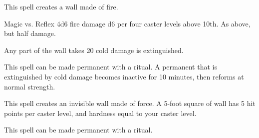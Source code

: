 \begin{spellheader}
\end{spellheader}
\begin{spellcontent}
    \begin{spelltargetinginfo}
    \end{spelltargetinginfo}
    \begin{spelleffects}
        \spelleffect This spell creates a wall made of fire.
        \spelldur{\durshort}
    \end{spelleffects}
\end{spellcontent}
\begin{spellsubcontent}
    \begin{spelltargetinginfo}
    \end{spelltargetinginfo}
    \begin{spelleffects}
        \begin{spellattack}{Magic vs. Reflex}
            \spellsuccess 4d6 fire damage \add d6 per four caster levels above 10th.
            \spellfailure As above, but half damage.
        \end{spellattack}
    \end{spelleffects}
\end{spellsubcontent}
\begin{spellfooter}
    \spellnotes Any part of the wall takes 20 cold damage is extinguished.

    This spell can be made permanent with a  ritual. A permanent  that is extinguished by cold damage becomes inactive for 10 minutes, then reforms at normal strength.
\end{spellfooter}

\begin{spellheader}
    \begin{spelltargetinginfo}
    \end{spelltargetinginfo}
\end{spellheader}
\begin{spellcontent}
    \begin{spelleffects}
        \spelleffect This spell creates an invisible wall made of force. A 5-foot square of wall has 5 hit points per caster level, and hardness equal to your caster level.
        \spelldur{\durshort \dismissable}
    \end{spelleffects}
\end{spellcontent}
\begin{spellfooter}
    \spellnotes \forcespellnotes

    This spell can be made permanent with a  ritual.
\end{spellfooter}

